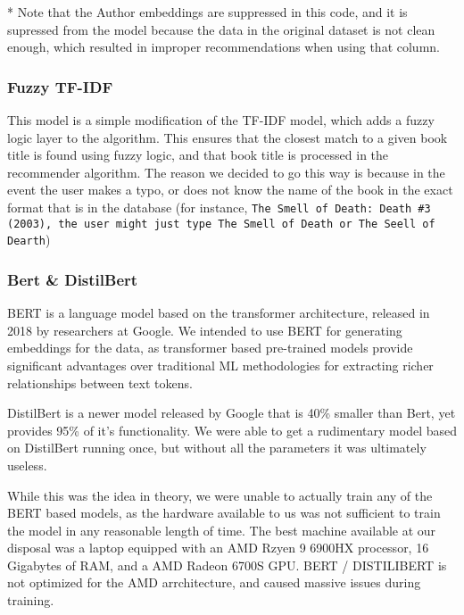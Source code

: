 * Note that the Author embeddings are suppressed in this code, and it is supressed from the model because the data in the original dataset is not clean enough, which resulted in improper recommendations when using that column.

\subsubsection*{Fuzzy TF-IDF}
This model is a simple modification of the TF-IDF model, which adds a fuzzy logic layer to the algorithm. This ensures that the closest match to a given book title is found using fuzzy logic, and that book title is processed in the recommender algorithm. The reason we decided to go this way is because in the event the user makes a typo, or does not know the name of the book in the exact format that is in the database (for instance, \texttt{The Smell of Death: Death \#3 (2003), the user might just type \texttt{The Smell of Death} or \texttt{The Seell of Dearth}})

\subsubsection*{Bert \& DistilBert}
BERT is a language model based on the transformer architecture, released in 2018 by researchers at Google. We intended to use BERT for generating embeddings for the data, as transformer based pre-trained models provide significant advantages over traditional ML methodologies for extracting richer relationships between text tokens.

DistilBert is a newer model released by Google that is 40\% smaller than Bert,
yet provides 95\% of it's functionality. We were able to get a rudimentary
model based on DistilBert running once, but without all the parameters it was
ultimately useless.

While this was the idea in theory, we were unable to actually train any of the
BERT based models, as the hardware available to us was not sufficient to train
the model in any reasonable length of time. The best machine available at our
disposal was a laptop equipped with an AMD Rzyen 9 6900HX processor, 16
Gigabytes of RAM, and a AMD Radeon 6700S GPU. BERT / DISTILIBERT is not
optimized for the AMD arrchitecture, and caused massive issues during training.

